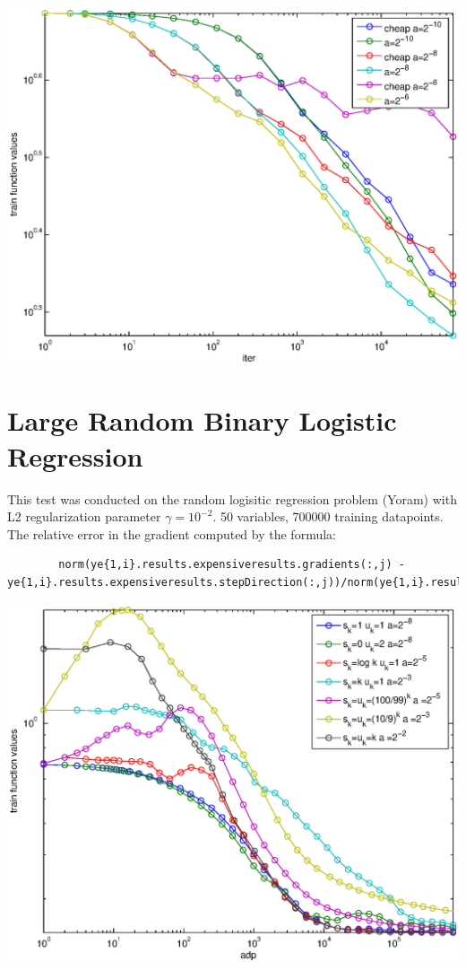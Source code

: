 \documentclass[12pt]{article}
\begin{document}
	\begin{center}
	\includegraphics{Figures/12-6-cheap.eps}    
	\end{center}
	
	\section{Large Random Binary Logistic Regression}
	
	This test was conducted on the random logisitic regression problem (Yoram) with L2 regularization parameter $\gamma = 10^{-2}$. 50 variables, 700000 training datapoints. The relative error in the gradient computed by the formula:
	\begin{verbatim}
		norm(ye{1,i}.results.expensiveresults.gradients(:,j) - ye{1,i}.results.expensiveresults.stepDirection(:,j))/norm(ye{1,i}.results.expensiveresults.gradients(:,j))
	\end{verbatim}
	
	\begin{center}
	\includegraphics{Figures/LRadp.eps}    
	\end{center}
	
\end{document}
